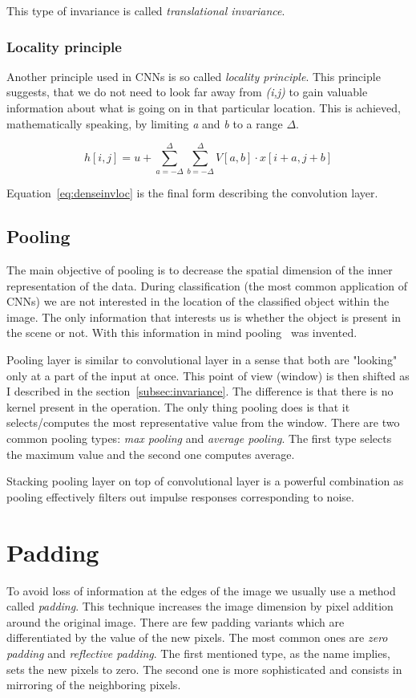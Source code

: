 This type of invariance is called \textit{translational invariance}.

\subsubsection{Locality principle}\label{subsec:locality}
Another principle used in CNNs is so called \textit{locality principle}.
This principle suggests, that we do not need to look far away from \textit{(i,j)} to gain valuable information about
what is going on in that particular location.
This is achieved, mathematically speaking, by limiting \textit{a} and \textit{b} to a range $\Delta$.

\begin{equation}
    \label{eq:denseinvloc}
    h[i, j] = u + \sum_{a=-\Delta}^{\Delta} \sum_{b=-\Delta}^{\Delta} V[a,b] \cdot x[i+a,j+b]
\end{equation}

Equation~\ref{eq:denseinvloc} is the final form describing the convolution layer.

\subsection{Pooling}\label{sec:pooling}
The main objective of pooling is to decrease the spatial dimension of the inner representation of the data.
During classification (the most common application of CNNs) we are not interested in the location of the classified
object within the image.
The only information that interests us is whether the object is present in the scene or not.
With this information in mind pooling~\cite{PoolingLayer} was invented.

Pooling layer is similar to convolutional layer in a sense that both are "looking" only at a part of the input at once.
This point of view (window) is then shifted as I described in the section~\ref{subsec:invariance}.
The difference is that there is no kernel present in the operation.
The only thing pooling does is that it selects/computes the most representative value from the window.
There are two common pooling types: \textit{max pooling} and \textit{average pooling}.
The first type selects the maximum value and the second one computes average.

Stacking pooling layer on top of convolutional layer is a powerful combination as pooling effectively filters out
impulse responses corresponding to noise.

\section{Padding}\label{subsec:padding}
To avoid loss of information at the edges of the image we usually use a method called \textit{padding}.
This technique increases the image dimension by pixel addition around the original image.
There are few padding variants which are differentiated by the value of the new pixels.
The most common ones are \textit{zero padding} and \textit{reflective padding}.
The first mentioned type, as the name implies, sets the new pixels to zero.
The second one is more sophisticated and consists in mirroring of the neighboring pixels.


